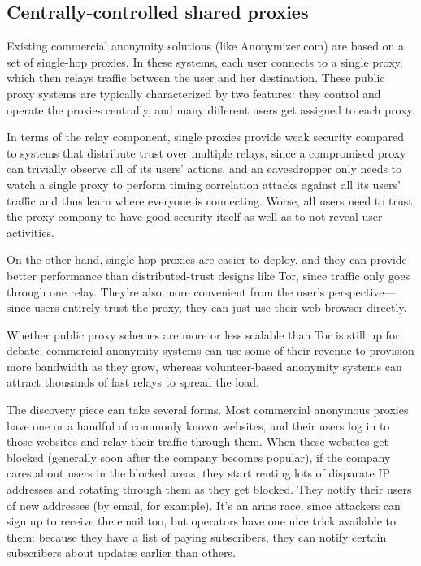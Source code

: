 \documentclass{llncs}
\begin{document}
\subsection{Centrally-controlled shared proxies}

Existing commercial anonymity solutions (like Anonymizer.com) are based
on a set of single-hop proxies. In these systems, each user connects to
a single proxy, which then relays traffic between the user and her
destination. These public proxy
systems are typically characterized by two features: they control and
operate the proxies centrally, and many different users get assigned
to each proxy.

In terms of the relay component, single proxies provide weak security
compared to systems that distribute trust over multiple relays, since a
compromised proxy can trivially observe all of its users' actions, and
an eavesdropper only needs to watch a single proxy to perform timing
correlation attacks against all its users' traffic and thus learn where
everyone is connecting. Worse, all users
need to trust the proxy company to have good security itself as well as
to not reveal user activities.

On the other hand, single-hop proxies are easier to deploy, and they
can provide better performance than distributed-trust designs like Tor,
since traffic only goes through one relay. They're also more convenient
from the user's perspective---since users entirely trust the proxy,
they can just use their web browser directly.

Whether public proxy schemes are more or less scalable than Tor is
still up for debate: commercial anonymity systems can use some of their
revenue to provision more bandwidth as they grow, whereas volunteer-based
anonymity systems can attract thousands of fast relays to spread the load.

The discovery piece can take several forms. Most commercial anonymous
proxies have one or a handful of commonly known websites, and their users
log in to those websites and relay their traffic through them. When
these websites get blocked (generally soon after the company becomes
popular), if the company cares about users in the blocked areas, they
start renting lots of disparate IP addresses and rotating through them
as they get blocked. They notify their users of new addresses (by email,
for example). It's an arms race, since attackers can sign up to receive the
email too, but operators have one nice trick available to them: because they
have a list of paying subscribers, they can notify certain subscribers
about updates earlier than others.
\end{document}
